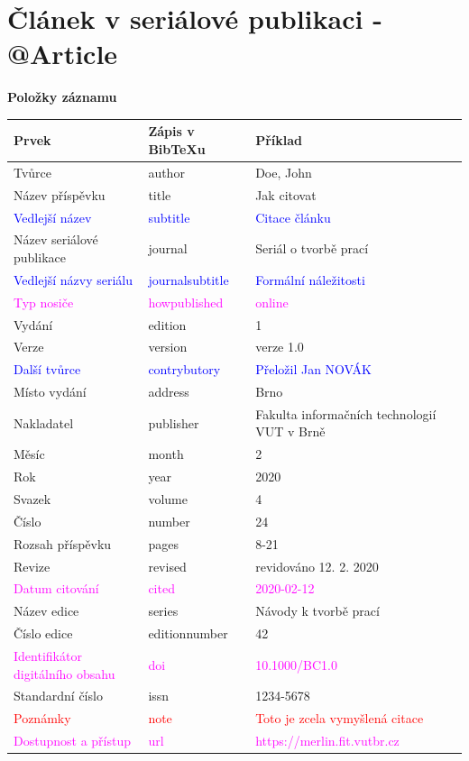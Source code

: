 \section*{Článek v seriálové publikaci - @Article}
\label{pr-casopis-clanek}
\noindent \textbf{Položky záznamu}

\medskip

\begin{tabularx}{\linewidth}{X X X}
    Prvek & Zápis v BibTeXu & Příklad \\\hline
    Tvůrce & author & Doe, John\\
    Název příspěvku & title & Jak citovat\\
    \textcolor{blue}{Vedlejší název} & \textcolor{blue}{subtitle} & \textcolor{blue}{Citace článku}\\
    Název seriálové publikace & journal & Seriál o tvorbě prací\\
    \textcolor{blue}{Vedlejší názvy seriálu} & \textcolor{blue}{journalsubtitle} & \textcolor{blue}{Formální náležitosti}\\
    \textcolor{magenta}{Typ nosiče} & \textcolor{magenta}{howpublished} & \textcolor{magenta}{online}\\
    Vydání & edition & 1\\
    Verze & version & verze 1.0\\
    \textcolor{blue}{Další tvůrce} & \textcolor{blue}{contrybutory} & \textcolor{blue}{Přeložil Jan NOVÁK}\\
    Místo vydání & address & Brno\\
    Nakladatel & publisher & Fakulta informačních technologií VUT v Brně\\
    Měsíc & month & 2\\
    Rok & year & 2020\\
    Svazek & volume & 4\\
    Číslo & number & 24\\
    Rozsah příspěvku & pages & 8-21\\
    Revize & revised & revidováno 12. 2. 2020\\
    \textcolor{magenta}{Datum citování} & \textcolor{magenta}{cited} & \textcolor{magenta}{2020-02-12}\\
    Název edice & series & Návody k tvorbě prací\\
    Číslo edice & editionnumber & 42\\
    \textcolor{magenta}{Identifikátor digitálního obsahu} & \textcolor{magenta}{doi} & \textcolor{magenta}{10.1000/BC1.0}\\
    Standardní číslo  & issn & 1234-5678\\
    \textcolor{red}{Poznámky} & \textcolor{red}{note} & \textcolor{red}{Toto je zcela vymyšlená citace}\\
    \textcolor{magenta}{Dostupnost a přístup} & \textcolor{magenta}{url} & \textcolor{magenta}{https://merlin.fit.vutbr.cz}
\end{tabularx}

